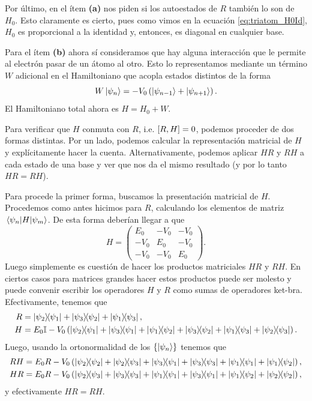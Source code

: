 \documentclass[10pt, a4paper]{article}
\numberwithin{equation}{subsection}
\begin{document}
Por último, en el ítem \textbf{(a)} nos piden si los autoestados de $R$ también
lo son de $H_0$. Esto claramente es cierto, pues como vimos en la ecuación
\eqref{eq:triatom_H0Id}, $H_0$ es proporcional a la identidad y, entonces, es
diagonal en cualquier base.

\bigbreak

Para el ítem \textbf{(b)} ahora sí consideramos que hay alguna interacción que
le permite al electrón pasar de un átomo al otro. Esto lo representamos
mediante un término $W$ adicional en el Hamiltoniano que acopla estados
distintos de la forma
\begin{equation}
  W\ket{\psi_n} = -V_0\left(\ket{\psi_{n-1}} + \ket{\psi_{n+1}}\right).
\end{equation}
El Hamiltoniano total ahora es $H = H_0 + W$.

Para verificar que $H$ conmuta con $R$, i.e. $\comm{R}{H} = 0$, podemos
proceder de dos formas distintas. Por un lado, podemos calcular la
representación matricial de $H$ y explícitamente hacer la cuenta.
Alternativamente, podemos aplicar $HR$ y $RH$ a cada estado de una base y ver
que nos da el mismo resultado (y por lo tanto $HR = RH$).

Para procede la primer forma, buscamos la presentación matricial de $H$.
Procedemos como antes hicimos para $R$, calculando los elementos de matriz
$\matrixel{\psi_n}{H}{\psi_m}$. De esta forma deberían llegar a que
\begin{equation}
  H = \begin{pmatrix}
     E_0 & -V_0 & -V_0 \\
    -V_0 &  E_0 & -V_0 \\
    -V_0 & -V_0 &  E_0
  \end{pmatrix}.
\end{equation}
Luego simplemente es cuestión de hacer los productos matriciales $HR$ y $RH$.
En ciertos casos para matrices grandes hacer estos productos puede ser molesto
y puede convenir escribir los operadores $H$ y $R$ como sumas de operadores
ket-bra. Efectivamente, tenemos que
\begin{align}
  R &= \ketbra{\psi_2}{\psi_1} + \ketbra{\psi_3}{\psi_2} +
       \ketbra{\psi_1}{\psi_3}, \\
  H &= E_0\mathbb{I} - V_0\left(\ketbra{\psi_2}{\psi_1} + \ketbra{\psi_3}{\psi_1} +
       \ketbra{\psi_1}{\psi_2} + \ketbra{\psi_3}{\psi_2} +
       \ketbra{\psi_1}{\psi_3} + \ketbra{\psi_2}{\psi_3}\right).
\end{align}
Luego, usando la ortonormalidad de los $\set{\ket{\psi_n}}$ tenemos que
\begin{align}
  RH &= E_0R - V_0\left(\ketbra{\psi_2}{\psi_2} + \ketbra{\psi_2}{\psi_3} +
    \ketbra{\psi_3}{\psi_1} + \ketbra{\psi_3}{\psi_3} + \ketbra{\psi_1}{\psi_1}
    + \ketbra{\psi_1}{\psi_2}\right), \\
  HR &= E_0R - V_0\left(\ketbra{\psi_2}{\psi_3} + \ketbra{\psi_3}{\psi_3} +
    \ketbra{\psi_1}{\psi_1} + \ketbra{\psi_3}{\psi_1} + \ketbra{\psi_1}{\psi_2}
    + \ketbra{\psi_2}{\psi_2}\right),
\end{align}
y efectivamente $HR = RH$.
\end{document}

